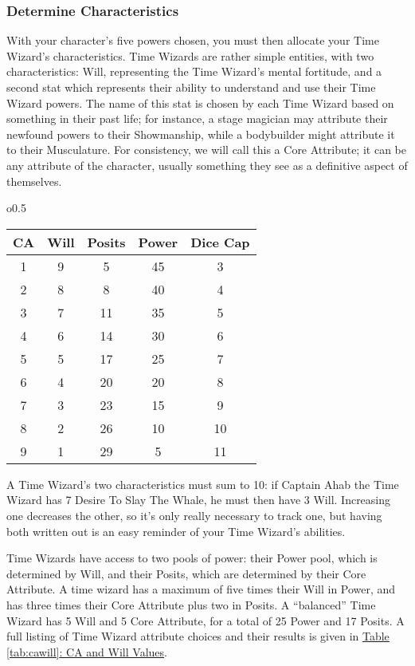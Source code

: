\documentclass[twoside]{article}
\begin{document}
\subsubsection{Determine Characteristics} \label{ssec:get-characteristics}
With your character's five powers chosen, you must then allocate your Time Wizard's
characteristics. Time Wizards are rather simple entities, with two characteristics: Will,
representing the Time Wizard's mental fortitude, and a second stat which represents their
ability to understand and use their Time Wizard powers. The name of this stat is chosen by each
Time Wizard based on something in their past life; for instance, a stage magician may attribute
their newfound powers to their Showmanship, while a bodybuilder might attribute it to their
Musculature. For consistency, we will call this a Core Attribute; it can be any attribute of the
character, usually something they see as a definitive aspect of themselves.

\begin{wraptable}{o}{0.5\textwidth}
   \caption{CA and Will Values}
   \label{tab:cawill}

   \begin{tabular}{cc|ccc}
   \textbf{CA} & \textbf{Will} & Posits & Power & Dice Cap\\ \hline
      1 & 9 &  5 & 45 &  3\\
      2 & 8 &  8 & 40 &  4\\
      3 & 7 & 11 & 35 &  5\\
      4 & 6 & 14 & 30 &  6\\
      5 & 5 & 17 & 25 &  7\\
      6 & 4 & 20 & 20 &  8\\
      7 & 3 & 23 & 15 &  9\\
      8 & 2 & 26 & 10 & 10\\
      9 & 1 & 29 &  5 & 11
   \end{tabular}
\end{wraptable}

A Time Wizard's two characteristics must sum to 10: if Captain Ahab the Time Wizard has 7 Desire
To Slay The Whale, he must then have 3 Will. Increasing one decreases the other, so it's only
really necessary to track one, but having both written out is an easy reminder of your Time
Wizard's abilities.

Time Wizards have access to two pools of power: their Power pool, which is determined by Will,
and their Posits, which are determined by their Core Attribute. A time wizard has a maximum of
five times their Will in Power, and has three times their Core Attribute plus two in Posits.
A ``balanced'' Time Wizard has 5 Will and 5 Core Attribute, for a total of 25 Power and 17
Posits. A full listing of Time Wizard attribute choices and their results is given in
\hyperref[tab:cawill]{Table \ref*{tab:cawill}: CA and Will Values}.
\end{document}
